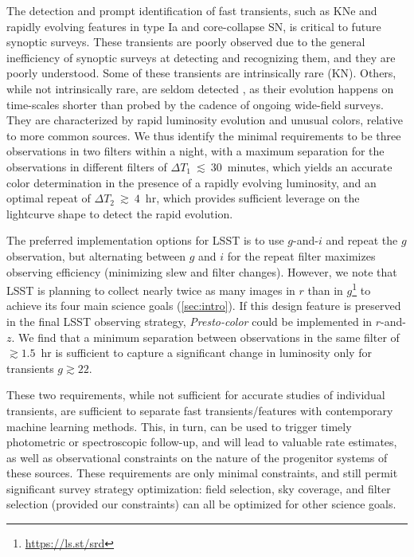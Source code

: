 \documentclass[letterpaper,longauthor,trackchanges,twocolumn,onecolappendix,sort&compress]{aastex62}
\newcommand{\dtone}{\ensuremath{\Delta T_1}}
\newcommand{\dttwo}{\ensuremath{\Delta T_2}}
\begin{document}
The detection and prompt identification of fast transients, such as KNe and rapidly evolving features in type Ia and core-collapse SN, is critical to future synoptic surveys. These transients are poorly observed due to the general inefficiency of synoptic surveys at detecting and recognizing them, and they are poorly understood. Some of these transients are intrinsically rare (KN). Others, while not intrinsically rare, are seldom detected \citep{Drout2014}, as their evolution happens on time-scales shorter than probed by the cadence of ongoing wide-field surveys. They are characterized by rapid luminosity evolution and unusual colors, relative to more common sources. We thus identify the minimal requirements to be three observations in two filters within a night, with a maximum separation for the observations in different filters of $\dtone~\lesssim~ 30$~minutes, which yields an accurate color determination in the presence of a rapidly evolving luminosity, and an optimal repeat of $\dttwo~\gtrsim~ 4$~hr, which provides sufficient leverage on the lightcurve shape to detect the rapid evolution.  

The preferred implementation options for LSST is to use $g$-and-$i$ and repeat the $g$ observation, but alternating between $g$ and $i$ for the repeat filter maximizes observing efficiency (minimizing slew and filter changes). However, we note that LSST is planning to collect nearly twice as many images in $r$ than in $g$\footnote{\url{https://ls.st/srd}} to achieve its four main science goals (\autoref{sec:intro}). If this design feature is preserved in the final LSST observing strategy, {\em Presto-color} could be implemented in  $r$-and-$z$. 
We find that a minimum separation between observations in the same filter of $\gtrsim 1.5$~hr is sufficient to capture a significant change in luminosity only for transients $g\gtrsim22$. 

These two requirements, while not sufficient for accurate studies of individual transients, are sufficient to separate fast transients/features with contemporary machine learning methods. This, in turn, can be used to trigger timely photometric or spectroscopic follow-up, and will lead to valuable rate estimates, as well as observational constraints on the nature of the progenitor systems of these sources. These requirements are only minimal constraints, and still permit significant survey strategy optimization: field selection, sky coverage, and filter selection (provided our constraints) can all be optimized for other science goals.
\end{document}

